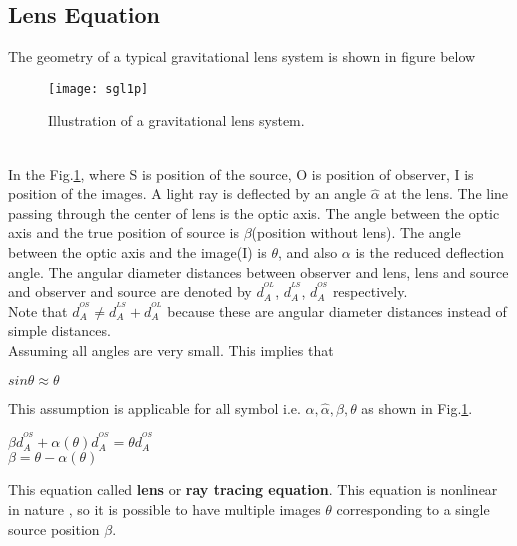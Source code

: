 \documentclass[12pt]{report}
\begin{document}
\subsection{Lens Equation}
The geometry of a typical gravitational lens system is shown in figure below \\
\begin{figure}[ht!]
\centering
\texttt{[image: sgl1p]}
\caption{Illustration of a gravitational lens system.\\
\label{point}}
\end{figure} \\
In the Fig.\ref{point}, where S is  position of the source, O is position of observer, I is position of the images. A light ray is deflected by an angle $\hat{\alpha}$ at the lens. The line passing through the center of lens is the optic axis. The angle between the optic axis and the true position of source is $\beta$(position without lens). The angle between the optic axis and the image(I) is $\theta$, and also $\alpha$ is the reduced deflection angle. The angular diameter distances between observer and lens, lens and source and observer and source are denoted by $d_A^{^{OL}}$, $d_A^{^{LS}}$, $d_A^{^{OS}}$ respectively. \\
Note that $d_A^{^{OS}}\neq d_A^{^{LS}}+d_A^{^{OL}}$ because these are angular diameter distances instead of simple distances. \\
Assuming all angles are very small. This implies that
\begin{center}
     $sin\theta\approx\theta$
\end{center}
This assumption is applicable for all symbol i.e. $\alpha,\hat\alpha,\beta,\theta$ as shown in Fig.\ref{point}.\\

\begin{center}
     $\beta d_A^{^{OS}}+\alpha(\theta)d_A^{^{OS}}=\theta d_A^{^{OS}}$ \\
      \vspace{2mm}
     $\boxed{\beta=\theta-\alpha(\theta)}$
\end{center}
This equation called \textbf{lens} or \textbf{ray tracing equation}. This
equation is nonlinear in nature , so it is possible to have multiple images $\theta$ corresponding to a single source position $\beta$.
\end{document}
